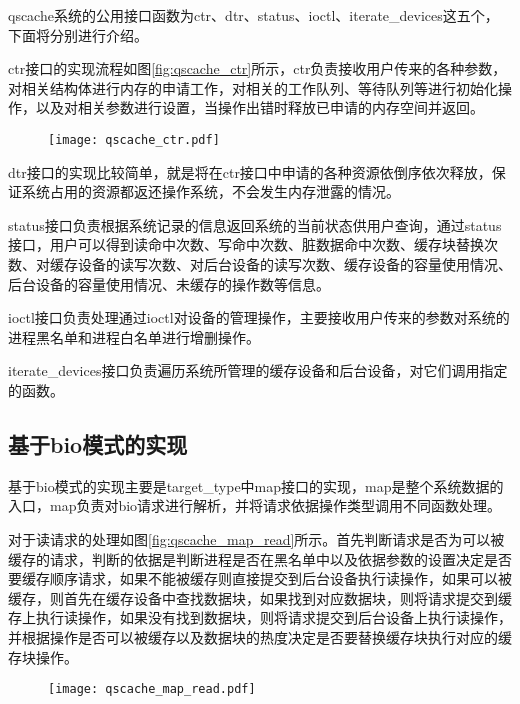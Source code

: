 qscache系统的公用接口函数为ctr、dtr、status、ioctl、iterate\_devices这五个，下面将分别进行介绍。

ctr接口的实现流程如图\ref{fig:qscache_ctr}所示，ctr负责接收用户传来的各种参数，对相关结构体进行内存的申请工作，对相关的工作队列、等待队列等进行初始化操作，以及对相关参数进行设置，当操作出错时释放已申请的内存空间并返回。

\begin{figure}[!htbp]
    \centering
    \texttt{[image: qscache\_ctr.pdf]}
\end{figure}

dtr接口的实现比较简单，就是将在ctr接口中申请的各种资源依倒序依次释放，保证系统占用的资源都返还操作系统，不会发生内存泄露的情况。

status接口负责根据系统记录的信息返回系统的当前状态供用户查询，通过status接口，用户可以得到读命中次数、写命中次数、脏数据命中次数、缓存块替换次数、对缓存设备的读写次数、对后台设备的读写次数、缓存设备的容量使用情况、后台设备的容量使用情况、未缓存的操作数等信息。

ioctl接口负责处理通过ioctl对设备的管理操作，主要接收用户传来的参数对系统的进程黑名单和进程白名单进行增删操作。

iterate\_devices接口负责遍历系统所管理的缓存设备和后台设备，对它们调用指定的函数。

\subsection{基于bio模式的实现}

基于bio模式的实现主要是target\_type中map接口的实现，map是整个系统数据的入口，map负责对bio请求进行解析，并将请求依据操作类型调用不同函数处理。

对于读请求的处理如图\ref{fig:qscache_map_read}所示。首先判断请求是否为可以被缓存的请求，判断的依据是判断进程是否在黑名单中以及依据参数的设置决定是否要缓存顺序请求，如果不能被缓存则直接提交到后台设备执行读操作，如果可以被缓存，则首先在缓存设备中查找数据块，如果找到对应数据块，则将请求提交到缓存上执行读操作，如果没有找到数据块，则将请求提交到后台设备上执行读操作，并根据操作是否可以被缓存以及数据块的热度决定是否要替换缓存块执行对应的缓存块操作。

\begin{figure}[!htbp]
    \centering
    \texttt{[image: qscache\_map\_read.pdf]}
\end{figure}

